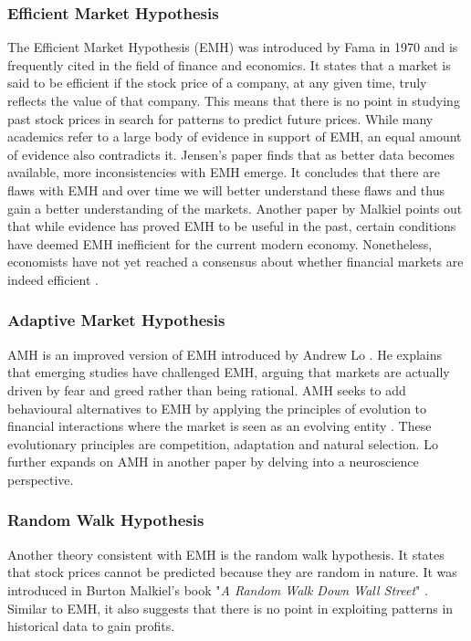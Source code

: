 \documentclass{UoYCSproject}
\begin{document}
\subsubsection{Efficient Market Hypothesis}
The Efficient Market Hypothesis (EMH) was introduced by Fama in 1970  \cite{malkiel1970efficient} and is frequently cited in the field of finance and economics. It states that a market is said to be efficient if the stock price of a company, at any given time, truly reflects the value of that company. This means that there is no point in studying past stock prices in search for patterns to predict future prices. While many academics refer to a large body of evidence in support of EMH, an equal amount of evidence also contradicts it. Jensen's \cite{jensen1978some} paper finds that as better data becomes available, more inconsistencies with EMH emerge. It concludes that there are flaws with EMH and over time we will better understand these flaws and thus gain a better understanding of the markets. Another paper by Malkiel \cite{malkiel2003efficient} points out that while evidence has proved EMH to be useful in the past, certain conditions have deemed EMH inefficient for the current modern economy. Nonetheless, economists have not yet reached a consensus about whether financial markets are indeed efficient \cite{lo2004adaptive}.  

\subsubsection{Adaptive Market Hypothesis}
AMH is an improved version of EMH introduced by Andrew Lo \cite{lo2004adaptive}. He explains that emerging studies have challenged EMH, arguing that markets are actually driven by fear and greed rather than being rational. AMH seeks to add behavioural alternatives to EMH by applying the principles of evolution to financial interactions where the market is seen as an evolving entity \cite{lo2004adaptive}. These evolutionary principles are competition, adaptation and natural selection. Lo further expands on AMH in another paper \cite{lo2005reconciling}
by delving into a neuroscience perspective.

\subsubsection{Random Walk Hypothesis}
Another theory consistent with EMH is the random walk hypothesis. It states that stock prices cannot be predicted because they are random in nature. It was introduced in Burton Malkiel's book "\textit{A Random Walk Down Wall Street}" \cite{malkiel1973random}. Similar to EMH, it also suggests that there is no point in exploiting patterns in historical data to gain profits.  
\end{document}
